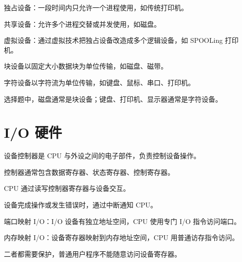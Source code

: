 \begin{points}
  \item 独占设备：一段时间内只允许一个进程使用，如传统打印机。
  \item 共享设备：允许多个进程交替或并发使用，如磁盘。
  \item 虚拟设备：通过虚拟技术把独占设备改造成多个逻辑设备，如 SPOOLing 打印机。
\end{points}


\begin{points}
  \item 块设备以固定大小数据块为单位传输，如磁盘、磁带。
  \item 字符设备以字符流为单位传输，如键盘、鼠标、串口、打印机。
  \item 选择题中，磁盘通常是块设备；键盘、打印机、显示器通常是字符设备。
\end{points}


\section{I/O 硬件}
\begin{points}
  \item 设备控制器是 CPU 与外设之间的电子部件，负责控制设备操作。
  \item 控制器通常包含数据寄存器、状态寄存器、控制寄存器。
  \item CPU 通过读写控制器寄存器与设备交互。
  \item 设备完成操作或发生错误时，通过中断通知 CPU。
\end{points}


\begin{points}
  \item 端口映射 I/O：I/O 设备有独立地址空间，CPU 使用专门 I/O 指令访问端口。
  \item 内存映射 I/O：设备寄存器映射到内存地址空间，CPU 用普通访存指令访问。
  \item 二者都需要保护，普通用户程序不能随意访问设备寄存器。
\end{points}


